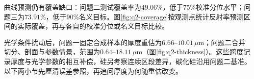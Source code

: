 曲线预测仍有覆盖缺口：问题二测试覆盖率为$49.06\%$，低于$75\%$校准分位水平；问题三为$73.91\%$，低于$90\%$名义目标。图\ref{fig:q2-coverage}按观测点统计反射率预测区间的实际覆盖，再与各自的校准分位或名义目标比较。

光学条件扰动后，问题一固定合成样本的厚度重估为$6.66$--$10.01\,\mu\mathrm{m}$；问题二合并切分、剖面与参数情景，范围为$0.64$--$18.11\,\mu\mathrm{m}$（图\ref{fig:q2-thickness}）。这些跨度记录厚度与光学参数的相互补偿，硅另考察连续区段差异，碳化硅沿用问题二基准。以下两小节先厘清误差参照，再追问厚度为何随重估改变。
